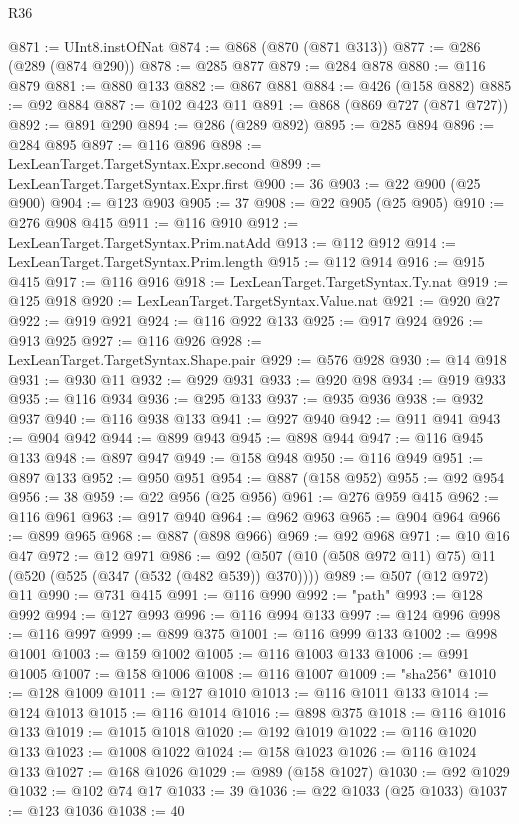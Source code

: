 \begin{lexlean}{R36}
\begin{coremodule}
@871 := UInt8.instOfNat
@874 := @868 (@870 (@871 @313))
@877 := @286 (@289 (@874 @290))
@878 := @285 @877
@879 := @284 @878
@880 := @116 @879
@881 := @880 @133
@882 := @867 @881
@884 := @426 (@158 @882)
@885 := @92 @884
@887 := @102 @423 @11
@891 := @868 (@869 @727 (@871 @727))
@892 := @891 @290
@894 := @286 (@289 @892)
@895 := @285 @894
@896 := @284 @895
@897 := @116 @896
@898 := LexLeanTarget.TargetSyntax.Expr.second
@899 := LexLeanTarget.TargetSyntax.Expr.first
@900 := 36
@903 := @22 @900 (@25 @900)
@904 := @123 @903
@905 := 37
@908 := @22 @905 (@25 @905)
@910 := @276 @908 @415
@911 := @116 @910
@912 := LexLeanTarget.TargetSyntax.Prim.natAdd
@913 := @112 @912
@914 := LexLeanTarget.TargetSyntax.Prim.length
@915 := @112 @914
@916 := @915 @415
@917 := @116 @916
@918 := LexLeanTarget.TargetSyntax.Ty.nat
@919 := @125 @918
@920 := LexLeanTarget.TargetSyntax.Value.nat
@921 := @920 @27
@922 := @919 @921
@924 := @116 @922 @133
@925 := @917 @924
@926 := @913 @925
@927 := @116 @926
@928 := LexLeanTarget.TargetSyntax.Shape.pair
@929 := @576 @928
@930 := @14 @918
@931 := @930 @11
@932 := @929 @931
@933 := @920 @98
@934 := @919 @933
@935 := @116 @934
@936 := @295 @133
@937 := @935 @936
@938 := @932 @937
@940 := @116 @938 @133
@941 := @927 @940
@942 := @911 @941
@943 := @904 @942
@944 := @899 @943
@945 := @898 @944
@947 := @116 @945 @133
@948 := @897 @947
@949 := @158 @948
@950 := @116 @949
@951 := @897 @133
@952 := @950 @951
@954 := @887 (@158 @952)
@955 := @92 @954
@956 := 38
@959 := @22 @956 (@25 @956)
@961 := @276 @959 @415
@962 := @116 @961
@963 := @917 @940
@964 := @962 @963
@965 := @904 @964
@966 := @899 @965
@968 := @887 (@898 @966)
@969 := @92 @968
@971 := @10 @16 @47
@972 := @12 @971
@986 := @92 (@507 (@10 (@508 @972 @11) @75) @11 (@520 (@525 (@347 (@532 (@482 @539)) @370))))
@989 := @507 (@12 @972) @11
@990 := @731 @415
@991 := @116 @990
@992 := "path"
@993 := @128 @992
@994 := @127 @993
@996 := @116 @994 @133
@997 := @124 @996
@998 := @116 @997
@999 := @899 @375
@1001 := @116 @999 @133
@1002 := @998 @1001
@1003 := @159 @1002
@1005 := @116 @1003 @133
@1006 := @991 @1005
@1007 := @158 @1006
@1008 := @116 @1007
@1009 := "sha256"
@1010 := @128 @1009
@1011 := @127 @1010
@1013 := @116 @1011 @133
@1014 := @124 @1013
@1015 := @116 @1014
@1016 := @898 @375
@1018 := @116 @1016 @133
@1019 := @1015 @1018
@1020 := @192 @1019
@1022 := @116 @1020 @133
@1023 := @1008 @1022
@1024 := @158 @1023
@1026 := @116 @1024 @133
@1027 := @168 @1026
@1029 := @989 (@158 @1027)
@1030 := @92 @1029
@1032 := @102 @74 @17
@1033 := 39
@1036 := @22 @1033 (@25 @1033)
@1037 := @123 @1036
@1038 := 40

\end{coremodule}
\end{lexlean}
